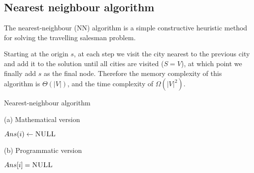 \subsection{Nearest neighbour algorithm} \label{algorithm-tsp-nn}
The nearest-neighbour (NN) algorithm is a simple \gls{constructive} heuristic method for solving the travelling salesman problem.\par
Starting at the origin $s$, at each step we visit the city nearest to the previous city and add it to the solution until all cities are visited ($S = V$), at which point we finally add $s$ as the final node.
Therefore the memory complexity of this algorithm is $\Theta (|V|)$, and the time complexity of $\Omega (|V|^{2})$.
\begin{algorithm}[ht]
    \caption{Nearest-neighbour algorithm}
    \label{alg:nearest neighbour}
    \begin{minipage}[t]{0.49\linewidth}
        (a) Mathematical version
        \begin{algorithmic}[1]
                 {$Ans(i) \gets \textsc{NULL}$}
                \EndFor
                \EndFor
                \State {}
            \EndFunction
        \end{algorithmic}
    \end{minipage}
    \begin{minipage}[t]{0.49\linewidth}
        (b) Programmatic version
        \begin{algorithmic}[1]
                 {$Ans[i] = \textsc{NULL}$}
                \EndFor
                        \EndIf
                    \EndFor
                \EndFor
                \State {}
            \EndFunction
        \end{algorithmic}
    \end{minipage}
\end{algorithm}

